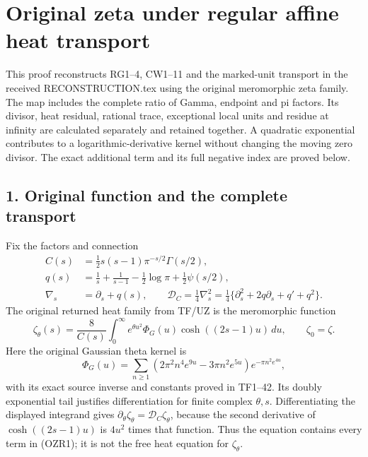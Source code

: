 \documentclass[
  10pt,
  a4paper,
]{article}
\author{}
\date{}
\begin{document}
{
\setcounter{tocdepth}{3}
\tableofcontents
}
\section{Original zeta under regular affine heat
transport}\label{original-zeta-under-regular-affine-heat-transport}

This proof reconstructs RG1--4, CW1--11 and the marked-unit transport in
the received RECONSTRUCTION.tex using the original meromorphic zeta
family. The map includes the complete ratio of Gamma, endpoint and pi
factors. Its divisor, heat residual, rational trace, exceptional local
units and residue at infinity are calculated separately and retained
together. A quadratic exponential contributes to a
logarithmic-derivative kernel without changing the moving zero divisor.
The exact additional term and its full negative index are proved below.

\subsection{1. Original function and the complete
transport}\label{original-function-and-the-complete-transport}

Fix the factors and connection \[
\begin{aligned}
C(s)&=\tfrac12s(s-1)\pi^{-s/2}\Gamma(s/2),\\
q(s)&=\frac1s+\frac1{s-1}-\frac12\log\pi+\frac12\psi(s/2),\\
\nabla_s&=\partial_s+q(s),\qquad
\mathcal D_C=\tfrac14\nabla_s^2
=\tfrac14\{\partial_s^2+2q\partial_s+q'+q^2\}.
\end{aligned}\tag{OZR1}
\] The original returned heat family from TF/UZ is the meromorphic
function \[
\zeta_\theta(s)=\frac8{C(s)}\int_0^\infty
 e^{\theta u^2}\Phi_G(u)\cosh((2s-1)u)\,du,
\qquad \zeta_0=\zeta.
\tag{OZR2}
\] Here the original Gaussian theta kernel is \[
\Phi_G(u)=\sum_{n\ge1}
 (2\pi^2n^4e^{9u}-3\pi n^2e^{5u})e^{-\pi n^2e^{4u}},
\] with its exact source inverse and constants proved in TF1--42. Its
doubly exponential tail justifies differentiation for finite complex
\(\theta,s\). Differentiating the displayed integrand gives
\(\partial_\theta\zeta_\theta=\mathcal D_C\zeta_\theta\), because the
second derivative of \(\cosh((2s-1)u)\) is \(4u^2\) times that function.
Thus the equation contains every term in (OZR1); it is not the free heat
equation for \(\zeta_\theta\).
\end{document}
